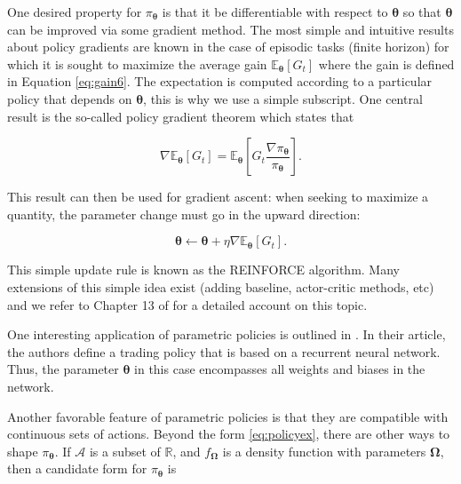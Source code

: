 \documentclass[]{krantz}
\theoremstyle{definition}
\theoremstyle{definition}
\theoremstyle{definition}
\theoremstyle{remark}
\begin{document}
One desired property for \(\pi_{\boldsymbol{\theta}}\) is that it be
differentiable with respect to \(\boldsymbol{\theta}\) so that
\(\boldsymbol{\theta}\) can be improved via some gradient method. The
most simple and intuitive results about policy gradients are known in
the case of episodic tasks (finite horizon) for which it is sought to
maximize the average gain \(\mathbb{E}_{\boldsymbol{\theta}}[G_t]\)
where the gain is defined in Equation \eqref{eq:gain6}. The expectation is
computed according to a particular policy that depends on
\(\boldsymbol{\theta}\), this is why we use a simple subscript. One
central result is the so-called policy gradient theorem which states
that

\begin{equation}
\label{eq:PGT}
\nabla \mathbb{E}_{\boldsymbol{\theta}}[G_t]=\mathbb{E}_{\boldsymbol{\theta}} \left[G_t\frac{\nabla \pi_{\boldsymbol{\theta}}}{\pi_{\boldsymbol{\theta}}} \right].
\end{equation}

This result can then be used for gradient ascent: when seeking to
maximize a quantity, the parameter change must go in the upward
direction:

\begin{equation}
\label{eq:ascent}
\boldsymbol{\theta} \leftarrow \boldsymbol{\theta} + \eta \nabla \mathbb{E}_{\boldsymbol{\theta}}[G_t].
\end{equation}

This simple update rule is known as the REINFORCE algorithm. Many
extensions of this simple idea exist (adding baseline, actor-critic
methods, etc) and we refer to Chapter 13 of
\citet{sutton2018reinforcement} for a detailed account on this topic.

One interesting application of parametric policies is outlined in
\citet{aboussalah2020continuous}. In their article, the authors define a
trading policy that is based on a recurrent neural network. Thus, the
parameter \(\boldsymbol{\theta}\) in this case encompasses all weights
and biases in the network.

Another favorable feature of parametric policies is that they are
compatible with continuous sets of actions. Beyond the form
\eqref{eq:policyex}, there are other ways to shape
\(\pi_{\boldsymbol{\theta}}\). If \(\mathcal{A}\) is a subset of
\(\mathbb{R}\), and \(f_{\boldsymbol{\Omega}}\) is a density function
with parameters \(\boldsymbol{\Omega}\), then a candidate form for
\(\pi_{\boldsymbol{\theta}}\) is
\end{document}
